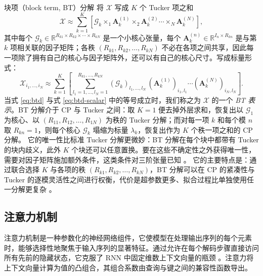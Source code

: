 \documentclass[11pt]{article}
\newcommand{\R}{\mathbb{R}}
\newcommand{\ten}[1]{\mathcal{#1}}
\newcommand{\mat}[1]{\mathbf{#1}}
\begin{document}

块项（block term, BT）分解 \cite{lathauwer2008btd} 将 $\ten{X}$ 写成 $K$ 个 Tucker 项之和
\begin{equation}
\label{eq:btd}
\ten{X} \approx \sum_{k=1}^{K} \left[ \ten{G}_k\times_1\mat{A}_k^{(1)}\times_2\mat{A}_k^{(2)}\cdots\times_N\mat{A}_k^{(N)} \right],
\end{equation}
其中每个 $\ten{G}_k\in\R^{R_{k1}\times R_{k2}\times \cdots\times R_{kN}}$ 是一个小核心张量，每个 $\mat{A}_k^{(n)}\in\R^{I_{n}\times R_{kn}}$ 是与第 $k$ 项相关联的因子矩阵；各秩 $(R_{k1},R_{k2},\ldots,R_{kN})$ 不必在各项之间共享，因此每一项除了拥有自己的核心与因子矩阵外，还可以有自己的核心尺寸。写成标量形式：
\begin{equation}
\label{eq:btd-scalar}
\ten{X}_{i_1, \dots, i_N} \approx \sum_{k=1}^{K} \left[ \sum_{l_1=1, \dots, l_N=1}^{R_{k1}, \ldots, R_{kN}} (\ten{G}_k)_{l_1, \dots, l_N}\,(\mat{A}_k^{(1)})_{i_1,l_1}\cdots(\mat{A}_k^{(N)})_{i_N,l_N} \right].
\end{equation}
当式 \eqref{eq:btd} 与式 \eqref{eq:btd-scalar} 中的等号成立时，我们称之为 $\ten{X}$ 的一个 \emph{BT 表示}。BT 分解介于 CP 与 Tucker 之间：取 $K=1$ 便去掉外层求和，恢复出以 $\ten{G}_1$ 为核心、以 $(R_{11},R_{12},\ldots,R_{1N})$ 为秩的 Tucker 分解；而对每一项 $k$ 和每个模 $n$ 取 $R_{kn}=1$，则每个核心 $\ten{G}_k$ 塌缩为标量 $\lambda_k$，恢复出作为 $K$ 个秩一项之和的 CP 分解。
它的唯一性比标准 Tucker 分解更微妙：BT 分解在每个块中都带有 Tucker 的块内歧义，此外 $K$ 个块还可以任意置换。要在这些不确定性之外获得唯一性，需要对因子矩阵施加额外条件，这类条件对三阶张量已知 \cite{lathauwer2008btd}。
它的主要特点是：通过联合选择 $K$ 与各项的秩 $(R_{k1},R_{k2},\ldots,R_{kN})$，BT 分解可以在 CP 的紧凑性与 Tucker 的逐模灵活性之间进行权衡，代价是超参数更多、拟合过程比单独使用任一分解更复杂 \cite{lathauwer2008btd}。

\color{black}

\subsection{注意力机制}

注意力机制是一种参数化的神经网络组件，它使模型在处理输出序列的每个元素时，能够选择性地聚焦于输入序列的显著特征。通过允许在每个解码步骤直接访问所有先前的隐藏状态，它克服了 RNN 中固定维数上下文向量的瓶颈 \cite{bahdanau2016attention}。注意力将上下文向量计算为值的凸组合，其组合系数由查询与键之间的兼容性函数导出。


\end{document}
